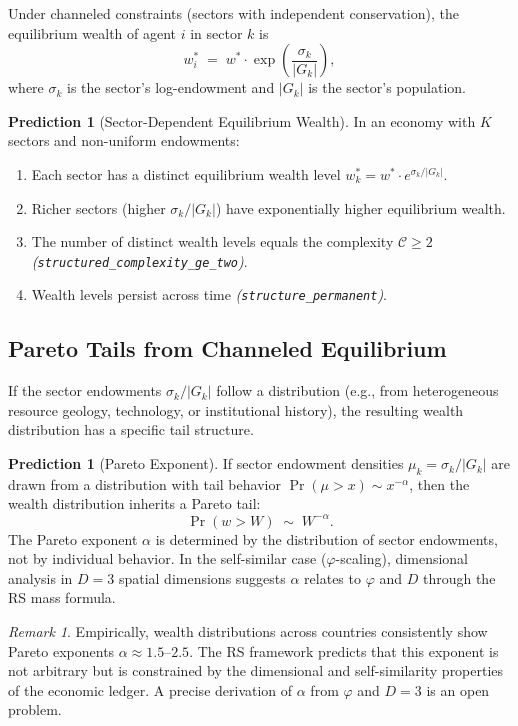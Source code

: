 \documentclass[11pt,a4paper]{article}
\theoremstyle{plain}
\theoremstyle{definition}
\newtheorem{prediction}[theorem]{Prediction}
\theoremstyle{remark}
\newtheorem{remark}[theorem]{Remark}
\begin{document}
Under channeled constraints (sectors with independent conservation), the equilibrium wealth of agent $i$ in sector $k$ is
\[
w_i^* \;=\; w^* \cdot \exp\!\left(\frac{\sigma_k}{|G_k|}\right),
\]
where $\sigma_k$ is the sector's log-endowment and $|G_k|$ is the sector's population.

\begin{prediction}[Sector-Dependent Equilibrium Wealth]\label{pred:wealth}
In an economy with $K$ sectors and non-uniform endowments:
\begin{enumerate}[nosep]
\item Each sector has a distinct equilibrium wealth level $w_k^* = w^* \cdot e^{\sigma_k / |G_k|}$.
\item Richer sectors (higher $\sigma_k / |G_k|$) have exponentially higher equilibrium wealth.
\item The number of distinct wealth levels equals the complexity $\mathcal{C} \ge 2$ \emph{(\texttt{structured\_complexity\_ge\_two})}.
\item Wealth levels persist across time \emph{(\texttt{structure\_permanent})}.
\end{enumerate}
\end{prediction}

\subsection{Pareto Tails from Channeled Equilibrium}

If the sector endowments $\sigma_k/|G_k|$ follow a distribution (e.g., from heterogeneous resource geology, technology, or institutional history), the resulting wealth distribution has a specific tail structure.

\begin{prediction}[Pareto Exponent]\label{pred:pareto}
If sector endowment densities $\mu_k = \sigma_k / |G_k|$ are drawn from a distribution with tail behavior $\Pr(\mu > x) \sim x^{-\alpha}$, then the wealth distribution inherits a Pareto tail:
\[
\Pr(w > W) \;\sim\; W^{-\alpha}.
\]
The Pareto exponent $\alpha$ is determined by the distribution of sector endowments, not by individual behavior.
In the self-similar case ($\varphi$-scaling), dimensional analysis in $D = 3$ spatial dimensions suggests $\alpha$ relates to $\varphi$ and $D$ through the RS mass formula.
\end{prediction}

\begin{remark}
Empirically, wealth distributions across countries consistently show Pareto exponents $\alpha \approx 1.5$--$2.5$.
The RS framework predicts that this exponent is not arbitrary but is constrained by the dimensional and self-similarity properties of the economic ledger.
A precise derivation of $\alpha$ from $\varphi$ and $D = 3$ is an open problem.
\end{remark}
\end{document}

